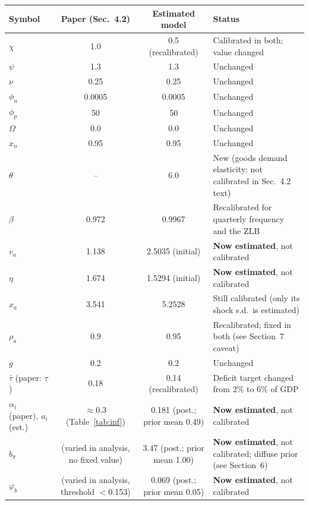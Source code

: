 \documentclass[11pt]{article}
\begin{document}
\begin{center}
\begin{tabular}{@{}lccl@{}}
\toprule
Symbol & Paper (Sec.\ 4.2) & Estimated model & Status \\
\midrule
$\chi$        & 1.0    & 0.5 (recalibrated) & Calibrated in both; value changed \\
$\psi$        & 1.3    & 1.3    & Unchanged \\
$\nu$         & 0.25   & 0.25   & Unchanged \\
$\phi_n$      & 0.0005 & 0.0005 & Unchanged \\
$\phi_p$      & 50     & 50     & Unchanged \\
$\Omega$      & 0.0    & 0.0    & Unchanged \\
$x_n$         & 0.95   & 0.95   & Unchanged \\
$\theta$      & --     & 6.0    & New (goods demand elasticity; not calibrated in Sec.\ 4.2 text) \\
$\beta$       & 0.972  & 0.9967 & Recalibrated for quarterly frequency and the ZLB \\
$v_a$         & 1.138  & 2.5035 (initial) & \textbf{Now estimated}, not calibrated \\
$\eta$        & 1.674  & 1.5294 (initial) & \textbf{Now estimated}, not calibrated \\
$x_a$         & 3.541  & 5.2528 & Still calibrated (only its shock s.d.\ is estimated) \\
$\rho_a$      & 0.9    & 0.95   & Recalibrated; fixed in both (see Section~7 caveat) \\
$g$           & 0.2    & 0.2    & Unchanged \\
$\bar\tau$ (paper: $\tau$) & 0.18 & 0.14 (recalibrated) & Deficit target changed from 2\% to 6\% of GDP \\
$\alpha_i$ (paper), $a_i$ (est.) & $\approx$0.3 (Table~\ref{tab:inf}) & 0.181 (post.; prior mean 0.49) & \textbf{Now estimated}, not calibrated \\
$b_\pi$       & (varied in analysis, no fixed value) & 3.47 (post.; prior mean 1.00) & \textbf{Now estimated}, not calibrated; diffuse prior (see Section~6) \\
$\varphi_b$   & (varied in analysis, threshold $<$0.153) & 0.069 (post.; prior mean 0.05) & \textbf{Now estimated}, not calibrated \\
\bottomrule
\end{tabular}
\end{center}
\label{tab:calibcompare}
\end{document}
